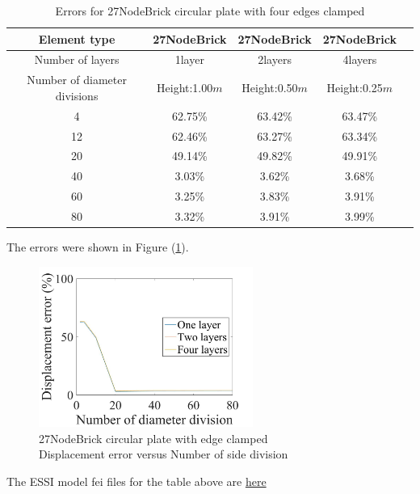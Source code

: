 \documentclass[fleqn,11pt]{article}
\begin{document}
\begin{table}[H]
  \centering
      \caption{Errors for 27NodeBrick circular plate with four edges clamped}
  \label{table errors for 27NodeBrick circular plate with four edges clamped}
\begin{tabular}{|c|c|c|c|c|}
\hline
Element type     & 27NodeBrick     & 27NodeBrick     & 27NodeBrick      \\ \hline
Number of layers & 1layer         & 2layers         & 4layers          \\ \hline
Number of diameter divisions & Height:1.00$m$ & Height:0.50$m$ & Height:0.25$m$  \\ \hline
4           & 62.75\% & 63.42\% & 63.47\%       \\ \hline
12          & 62.46\% & 63.27\% & 63.34\%       \\ \hline
20          & 49.14\% & 49.82\% & 49.91\%       \\ \hline
40          & 3.03\%  & 3.62\%  & 3.68\%        \\ \hline
60          & 3.25\%  & 3.83\%  & 3.91\%        \\ \hline
80          & 3.32\%  & 3.91\%  & 3.99\%        \\
\hline
\end{tabular}
\end{table}

The errors were shown in Figure (\ref{fig 27NodeBrick circular plate with edge clamped}).
\begin{figure}[H]
  \centering
  \includegraphics[width=7cm]{../Figure-files/error27brick_circular_plate_clamped100.jpeg}
  \captionsetup{justification=centering,margin=3cm}
  \caption{27NodeBrick circular plate with edge clamped\\
      Displacement error   versus   Number of side division}
  \label{fig 27NodeBrick circular plate with edge clamped}
\end{figure}



The ESSI model fei files for the table above are \href{https://github.com/yuan-energy/ESSI_Verification/blob/master/27NodeBrick/circular_plate_clamped/circular_plate_clamped.tar.gz?raw=true}{here}
\end{document}
